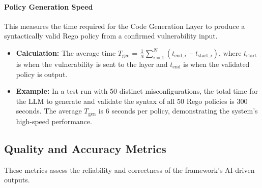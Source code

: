 \paragraph{Policy Generation Speed} This measures the time required for the Code Generation Layer to produce a syntactically valid Rego policy from a confirmed vulnerability input.
\begin{itemize}
    \item \textbf{Calculation:} The average time \( T_{\text{gen}} = \frac{1}{N} \sum_{i=1}^{N} (t_{\text{end},i} - t_{\text{start},i}) \), where \( t_{\text{start}} \) is when the vulnerability is sent to the layer and \( t_{\text{end}} \) is when the validated policy is output.
    \item \textbf{Example:} In a test run with 50 distinct misconfigurations, the total time for the LLM to generate and validate the syntax of all 50 Rego policies is 300 seconds. The average \( T_{\text{gen}} \) is 6 seconds per policy, demonstrating the system's high-speed performance.
\end{itemize}


\subsection*{Quality and Accuracy Metrics}
These metrics assess the reliability and correctness of the framework's AI-driven outputs.

